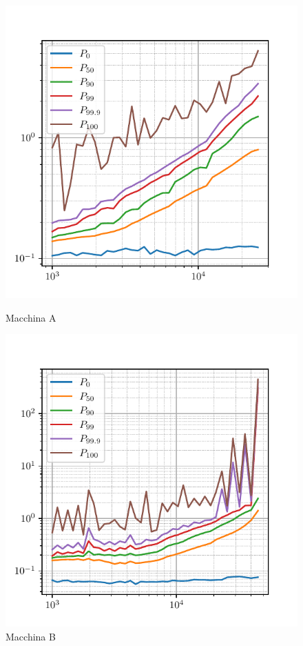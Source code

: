 \begin{figure}[htbp]
    \centering
    \begin{minipage}[t]{0.48\textwidth}
        \centering
        \includegraphics[width=\textwidth]{03-risultati/freq-latency/bench-get-a}
        \caption*{Macchina A}
    \end{minipage}
    \hfill
    \begin{minipage}[t]{0.48\textwidth}
        \centering
        \includegraphics[width=\textwidth]{03-risultati/freq-latency/bench-get-c}
        \caption*{Macchina B}
    \end{minipage}


\end{figure}
